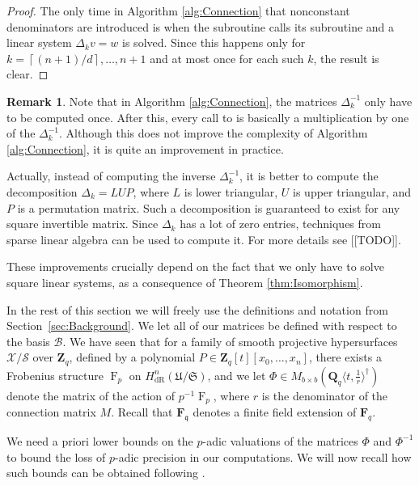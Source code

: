 \documentclass[a4paper,11pt]{article}
\numberwithin{equation}{section}
\providecommand{\ceil}[1]{\left\lceil#1\right\rceil}   %
\newcommand{\ZZ}{\mathbf{Z}} %
\newcommand{\QQ}{\mathbf{Q}} %
\newcommand{\FF}{\mathbf{F}} %
\DeclareMathOperator{\Frob}{F}           %
\providecommand{\HdR}{H_{\text{dR}}}    %
\providecommand{\cB}{\mathcal{B}} %
\theoremstyle{definition}
\newtheorem{rem}[thm]{Remark}
\begin{document}
\begin{proof}
The only time in Algorithm \ref{alg:Connection} that nonconstant denominators are introduced is when the subroutine {} 
calls its subroutine {} and a linear system $\Delta_k v = w$ is solved. Since this happens only for 
$k=\ceil{(n+1)/d}, \dotsc, n+1$ and at most once for each such $k$, the result is clear.
\end{proof}

\begin{rem} Note that in Algorithm \ref{alg:Connection}, the matrices $\Delta_k^{-1}$ only have to be computed
once. After this, every call to {} is basically a multiplication by one of the $\Delta_k^{-1}$.
Although this does not improve the complexity of Algorithm \ref{alg:Connection}, it is quite an improvement 
in practice. 

Actually, instead of computing the inverse $\Delta_k^{-1}$, it is better to compute the 
decomposition $\Delta_k = L U P$, where $L$ is lower triangular, $U$ is upper triangular, and
$P$ is a permutation matrix. Such a decomposition is guaranteed to exist for any square invertible
matrix. Since $\Delta_k$ has a lot of zero entries, techniques from sparse linear algebra can be 
used to compute it. For more details see [[TODO]].

These improvements crucially depend on the fact that we only have to solve square linear
systems, as a consequence of Theorem \ref{thm:Isomorphism}.
\end{rem}

In the rest of this section we will freely use the definitions and notation from Section~\ref{sec:Background}. 
We let all of our matrices be defined with respect to the basis $\cB$. We have seen that for a
family of smooth projective hypersurfaces $\mathcal{X}/\mathcal{S}$ over $\ZZ_q$, 
defined by a polynomial $P \in \ZZ_q[t][x_0,\ldots,x_n]$, there exists 
a Frobenius structure $\Frob_p$ on $\HdR^n(\mathfrak{U}/\mathfrak{S})$, and we let 
$\Phi \in M_{b \times b}(\QQ_q \langle t, \frac{1}{r} \rangle^{\dag})$ denote the 
matrix of the action of $p^{-1}\Frob_p$, where $r$ is the denominator of the connection 
matrix $M$. Recall that $\FF_{\mathfrak{q}}$ denotes a finite field extension of $\FF_q$. 

We need a priori lower bounds on the $p$-adic valuations of the matrices $\Phi$ and 
$\Phi^{-1}$ to bound the loss of $p$-adic precision in our computations. We will now
recall how such bounds can be obtained following \cite{AbbottKedlayaRoe2006}.
\end{document}
